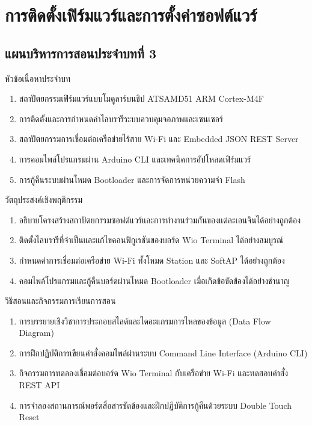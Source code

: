 \chapter{การติดตั้งเฟิร์มแวร์และการตั้งค่าซอฟต์แวร์}
\label{chap:ch03}

\section*{แผนบริหารการสอนประจำบทที่ 3}

\begin{planbox}{หัวข้อเนื้อหาประจำบท}
\begin{enumerate}[topsep=2pt, itemsep=1pt, partopsep=0pt, parsep=0pt, leftmargin=1.5em]
    \item สถาปัตยกรรมเฟิร์มแวร์แบบโมดูลาร์บนชิป ATSAMD51 ARM Cortex-M4F
    \item การติดตั้งและการกำหนดค่าไลบรารีระบบควบคุมจอภาพและเซนเซอร์
    \item สถาปัตยกรรมการเชื่อมต่อเครือข่ายไร้สาย Wi-Fi และ Embedded JSON REST Server
    \item การคอมไพล์โปรแกรมผ่าน Arduino CLI และเทคนิคการอัปโหลดเฟิร์มแวร์
    \item การกู้คืนระบบผ่านโหมด Bootloader และการจัดการหน่วยความจำ Flash
\end{enumerate}
\end{planbox}

\begin{planbox}{วัตถุประสงค์เชิงพฤติกรรม}
\begin{enumerate}[topsep=2pt, itemsep=1pt, partopsep=0pt, parsep=0pt, leftmargin=1.5em]
    \item อธิบายโครงสร้างสถาปัตยกรรมซอฟต์แวร์และการทำงานร่วมกันของแต่ละเอนจินได้อย่างถูกต้อง
    \item ติดตั้งไลบรารีที่จำเป็นและแก้ไขคอนฟิกูเรชันของบอร์ด Wio Terminal ได้อย่างสมบูรณ์
    \item กำหนดค่าการเชื่อมต่อเครือข่าย Wi-Fi ทั้งโหมด Station และ SoftAP ได้อย่างถูกต้อง
    \item คอมไพล์โปรแกรมและกู้คืนบอร์ดผ่านโหมด Bootloader เมื่อเกิดข้อขัดข้องได้อย่างชำนาญ
\end{enumerate}
\end{planbox}

\newpage

\begin{planbox}{วิธีสอนและกิจกรรมการเรียนการสอน}
\begin{enumerate}[topsep=2pt, itemsep=1pt, partopsep=0pt, parsep=0pt, leftmargin=1.5em]
    \item การบรรยายเชิงวิชาการประกอบสไลด์และไดอะแกรมการไหลของข้อมูล (Data Flow Diagram)
    \item การฝึกปฏิบัติการเขียนคำสั่งคอมไพล์ผ่านระบบ Command Line Interface (Arduino CLI)
    \item กิจกรรมการทดลองเชื่อมต่อบอร์ด Wio Terminal กับเครือข่าย Wi-Fi และทดสอบคำสั่ง REST API
    \item การจำลองสถานการณ์พอร์ตสื่อสารขัดข้องและฝึกปฏิบัติการกู้คืนด้วยระบบ Double Touch Reset
\end{enumerate}
\end{planbox}

